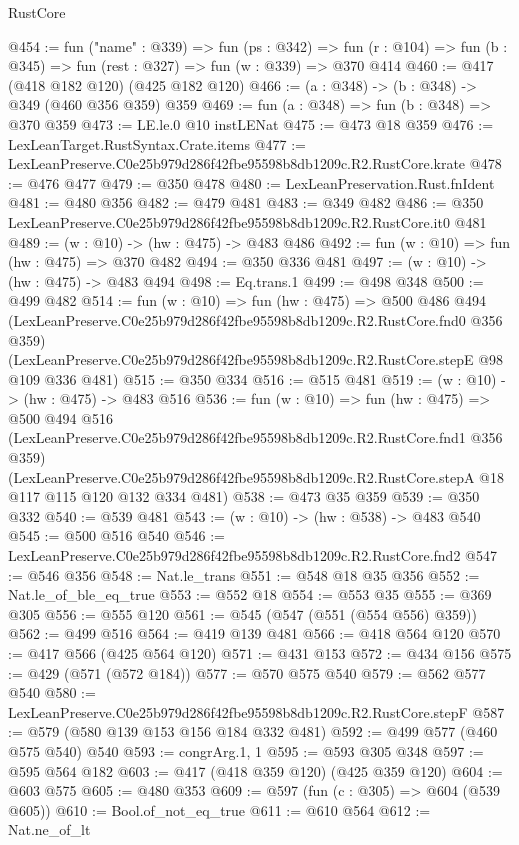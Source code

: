 \begin{lexlean}{RustCore}
\begin{coremodule}
@454 := fun ("name" : @339) =>
  fun (ps : @342) =>
  fun (r : @104) => fun (b : @345) => fun (rest : @327) => fun (w : @339) => @370 @414
@460 := @417 (@418 @182 @120) (@425 @182 @120)
@466 := (a : @348) -> (b : @348) -> @349 (@460 @356 @359) @359
@469 := fun (a : @348) => fun (b : @348) => @370 @359
@473 := LE.le.{0} @10 instLENat
@475 := @473 @18 @359
@476 := LexLeanTarget.RustSyntax.Crate.items
@477 := LexLeanPreserve.C0e25b979d286f42fbe95598b8db1209c.R2.RustCore.krate
@478 := @476 @477
@479 := @350 @478
@480 := LexLeanPreservation.Rust.fnIdent
@481 := @480 @356
@482 := @479 @481
@483 := @349 @482
@486 := @350 LexLeanPreserve.C0e25b979d286f42fbe95598b8db1209c.R2.RustCore.it0 @481
@489 := (w : @10) -> (hw : @475) -> @483 @486
@492 := fun (w : @10) => fun (hw : @475) => @370 @482
@494 := @350 @336 @481
@497 := (w : @10) -> (hw : @475) -> @483 @494
@498 := Eq.trans.{1}
@499 := @498 @348
@500 := @499 @482
@514 := fun (w : @10) =>
  fun (hw : @475) =>
  @500
    @486
    @494
    (LexLeanPreserve.C0e25b979d286f42fbe95598b8db1209c.R2.RustCore.fnd0 @356 @359)
    (LexLeanPreserve.C0e25b979d286f42fbe95598b8db1209c.R2.RustCore.stepE @98 @109 @336 @481)
@515 := @350 @334
@516 := @515 @481
@519 := (w : @10) -> (hw : @475) -> @483 @516
@536 := fun (w : @10) =>
  fun (hw : @475) =>
  @500
    @494
    @516
    (LexLeanPreserve.C0e25b979d286f42fbe95598b8db1209c.R2.RustCore.fnd1 @356 @359)
    (LexLeanPreserve.C0e25b979d286f42fbe95598b8db1209c.R2.RustCore.stepA
      @18
      @117
      @115
      @120
      @132
      @334
      @481)
@538 := @473 @35 @359
@539 := @350 @332
@540 := @539 @481
@543 := (w : @10) -> (hw : @538) -> @483 @540
@545 := @500 @516 @540
@546 := LexLeanPreserve.C0e25b979d286f42fbe95598b8db1209c.R2.RustCore.fnd2
@547 := @546 @356
@548 := Nat.le_trans
@551 := @548 @18 @35 @356
@552 := Nat.le_of_ble_eq_true
@553 := @552 @18
@554 := @553 @35
@555 := @369 @305
@556 := @555 @120
@561 := @545 (@547 (@551 (@554 @556) @359))
@562 := @499 @516
@564 := @419 @139 @481
@566 := @418 @564 @120
@570 := @417 @566 (@425 @564 @120)
@571 := @431 @153
@572 := @434 @156
@575 := @429 (@571 (@572 @184))
@577 := @570 @575 @540
@579 := @562 @577 @540
@580 := LexLeanPreserve.C0e25b979d286f42fbe95598b8db1209c.R2.RustCore.stepF
@587 := @579 (@580 @139 @153 @156 @184 @332 @481)
@592 := @499 @577 (@460 @575 @540) @540
@593 := congrArg.{1, 1}
@595 := @593 @305 @348
@597 := @595 @564 @182
@603 := @417 (@418 @359 @120) (@425 @359 @120)
@604 := @603 @575
@605 := @480 @353
@609 := @597 (fun (c : @305) => @604 (@539 @605))
@610 := Bool.of_not_eq_true
@611 := @610 @564
@612 := Nat.ne_of_lt

\end{coremodule}
\end{lexlean}
